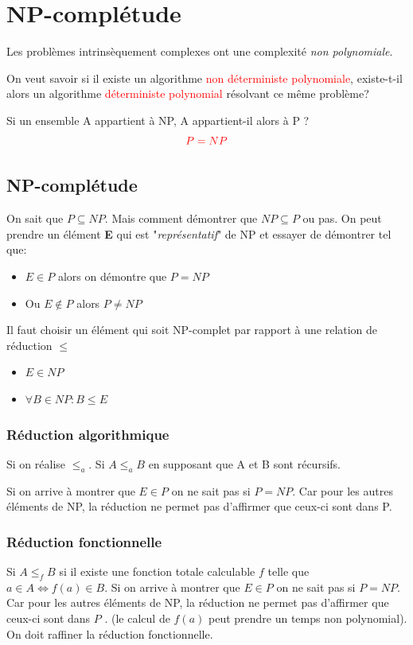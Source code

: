\documentclass{report}
\begin{document}
\chapter{NP-complétude}
Les problèmes intrinsèquement complexes ont une complexité \textit{non polynomiale}.\par 
On veut savoir si il existe un algorithme \textcolor{red}{non déterministe polynomiale}, existe-t-il alors un algorithme \textcolor{red}{déterministe polynomial} résolvant ce même problème?\par 
Si un ensemble A appartient à NP, A appartient-il alors à P ?
\begin{equation}
\textcolor{red}{P = NP}
\end{equation}

\section{NP-complétude}
On sait que $P \subseteq NP$. Mais comment démontrer que $NP \subseteq P$ ou pas. On peut prendre un élément \textbf{E} qui est "\textit{représentatif}" de NP et essayer de démontrer tel que:
\begin{itemize}
\item $E \in P$ alors on démontre que $P = NP$
\item Ou $E \notin P$ alors $P \neq NP$
\end{itemize}
Il faut choisir un élément qui soit NP-complet par rapport à une relation de réduction $\leq$
\begin{itemize}
\item $E \in NP$
\item $\forall B \in NP: B \leq E$
\end{itemize}

\subsection{Réduction algorithmique}
Si on réalise $\leq_a$. Si $A \leq_a B$ en supposant que A et B sont récursifs.\par 
Si on arrive à montrer que $E \in P$ on ne sait pas si $P = NP$. Car pour les autres éléments de NP, la réduction ne permet pas d'affirmer que ceux-ci sont dans P.

\subsection{Réduction fonctionnelle}
Si $A \leq_f B$ si il existe une fonction totale calculable $f$ telle que $a \in A \Leftrightarrow f(a) \in B$. Si on arrive à montrer que $E \in P$ on ne sait pas si $P = NP$. Car pour les autres éléments de NP, la réduction ne permet pas d'affirmer que ceux-ci sont dans $P$ . (le calcul de $f(a)$ peut prendre un temps non polynomial). On doit raffiner la réduction fonctionnelle.
\end{document}
